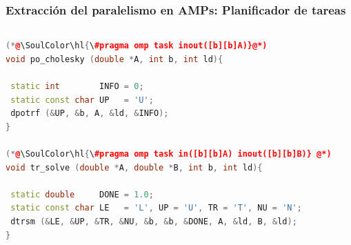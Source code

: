 \documentclass[10pt]{beamer}
\makeatletter
\newcommand\SoulColor{%
  \let\set@color\beamerorig@set@color
  \let\reset@color\beamerorig@reset@color}
\makeatother
\begin{document}
\begin{frame}[fragile]
  \frametitle{Extracción del paralelismo en AMPs: Planificador de tareas}
  \begin{columns}
    \begin{column}{0.9\textwidth}
\begin{lstlisting}[language=C++]
(*@\SoulColor\hl{\#pragma omp task inout([b][b]A)}@*)
void po_cholesky (double *A, int b, int ld){

 static int        INFO = 0;
 static const char UP   = 'U';
 dpotrf (&UP, &b, A, &ld, &INFO);
}

(*@\SoulColor\hl{\#pragma omp task in([b][b]A) inout([b][b]B)} @*)
void tr_solve (double *A, double *B, int b, int ld){

 static double     DONE = 1.0;
 static const char LE   = 'L', UP = 'U', TR = 'T', NU = 'N';
 dtrsm (&LE, &UP, &TR, &NU, &b, &b, &DONE, A, &ld, B, &ld);
}
\end{lstlisting}
    \end{column}
    \begin{column}{0.1\textwidth}
    \end{column}

  \end{columns}



\end{frame}
\end{document}
